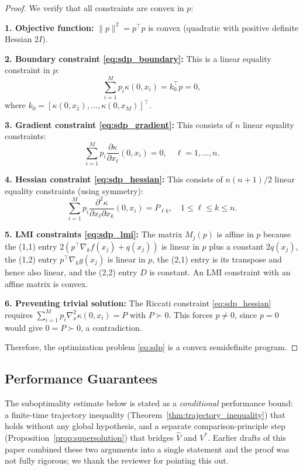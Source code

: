 \documentclass[11pt]{article}
\begin{document}
\begin{proof}
We verify that all constraints are convex in $p$:

\textbf{1. Objective function:} $\|p\|^2 = p^\top p$ is convex (quadratic with positive definite Hessian $2I$).

\textbf{2. Boundary constraint \eqref{eq:sdp_boundary}:} This is a linear equality constraint in $p$:
\[
\sum_{i=1}^M p_i \kappa(0, x_i) = k_0^\top p = 0,
\]
where $k_0 = [\kappa(0, x_1), \ldots, \kappa(0, x_M)]^\top$.

\textbf{3. Gradient constraint \eqref{eq:sdp_gradient}:} This consists of $n$ linear equality constraints:
\[
\sum_{i=1}^M p_i \frac{\partial \kappa}{\partial x_\ell}(0, x_i) = 0, \quad \ell = 1, \ldots, n.
\]

\textbf{4. Hessian constraint \eqref{eq:sdp_hessian}:} This consists of $n(n+1)/2$ linear equality constraints (using symmetry):
\[
\sum_{i=1}^M p_i \frac{\partial^2 \kappa}{\partial x_\ell \partial x_k}(0, x_i) = P_{\ell k}, \quad 1 \leq \ell \leq k \leq n.
\]

\textbf{5. LMI constraints \eqref{eq:sdp_lmi}:} The matrix $M_j(p)$ is affine in $p$ because the (1,1) entry $2(p^\top \nabla_k f(x_j) + q(x_j))$ is linear in $p$ plus a constant $2q(x_j)$, the (1,2) entry $p^\top \nabla_k g(x_j)$ is linear in $p$, the (2,1) entry is its transpose and hence also linear, and the (2,2) entry $D$ is constant. An LMI constraint with an affine matrix is convex.

\textbf{6. Preventing trivial solution:} The Riccati constraint \eqref{eq:sdp_hessian} requires $\sum_{i=1}^M p_i \nabla_x^2 \kappa(0, x_i) = P$ with $P \succ 0$. This forces $p \neq 0$, since $p = 0$ would give $0 = P \succ 0$, a contradiction.

Therefore, the optimization problem \eqref{eq:sdp} is a convex semidefinite program.
\end{proof}

\subsection{Performance Guarantees}

The suboptimality estimate below is stated as a \emph{conditional} performance bound: a finite-time trajectory inequality (Theorem~\ref{thm:trajectory_inequality}) that holds without any global hypothesis, and a separate comparison-principle step (Proposition~\ref{prop:supersolution}) that bridges $\hat V$ and $V^*$. Earlier drafts of this paper combined these two arguments into a single statement and the proof was not fully rigorous; we thank the reviewer for pointing this out.
\end{document}
